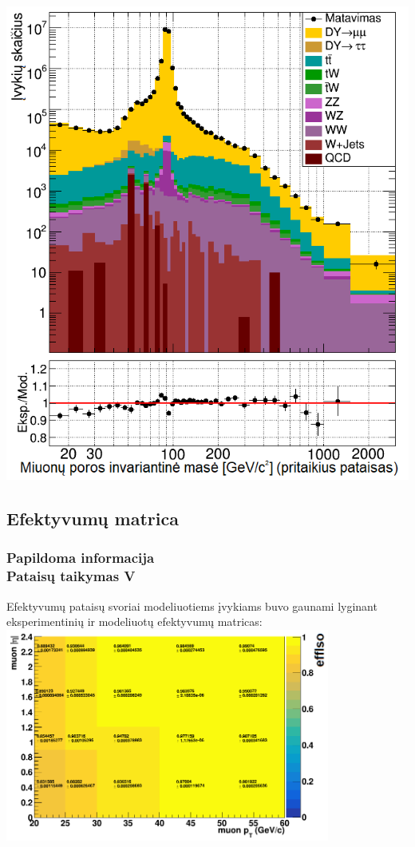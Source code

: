 \documentclass[xcolor=dvipsnames]{beamer}
\begin{document}
\begin{frame}
\begin{minipage}{0.49\textwidth}
		\includegraphics[width=0.9\linewidth]{mumuMassAfter_SMALL.png}
	\end{minipage}
\end{frame}

\begin{frame}
	\subsection{Efektyvumų matrica}
	\frametitle{Papildoma informacija\\ \small Pataisų taikymas V}
	Efektyvumų pataisų svoriai modeliuotiems įvykiams buvo gaunami lyginant eksperimentinių ir modeliuotų efektyvumų matricas:\\
	\vspace{0.1cm}
	\centering
	\includegraphics[width=0.8\textwidth]{efficiency.png}
\end{frame}
\end{document}
